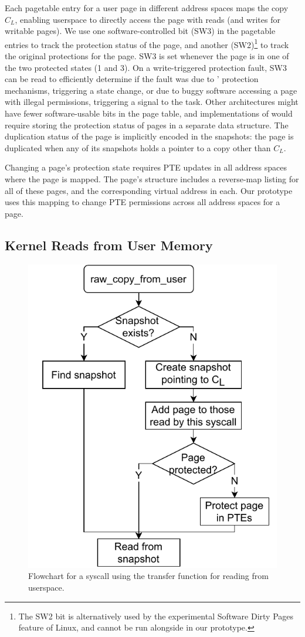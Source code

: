 Each pagetable entry for a user page in different address spaces
maps the copy $C_L$, enabling userspace to directly access the page
with reads (and writes for writable pages).
We use one software-controlled bit (SW3) in the pagetable entries
to track the protection status of the page, and another
(SW2)\footnote{The SW2 bit is alternatively used by the experimental Software Dirty Pages feature of
Linux, and cannot be run alongside \midas in our prototype.}
to track the original protections for the page.
SW3 is set whenever the page is in one of the two protected
states (1 and 3).
On a write-triggered protection fault, SW3 can be read to
efficiently determine if the fault was due to \midas' protection
mechanisms, triggering a state change, or due to buggy software
accessing a page with illegal permissions, triggering a signal to
the task.
Other architectures might have fewer software-usable
bits in the page table, and implementations of \midas would
require storing the protection status of pages in a separate data structure.
The duplication status of the page is implicitly encoded in the
snapshots: the page is duplicated when any of its snapshots
holds a pointer to a copy other than $C_L$.

Changing a page's protection state requires PTE updates
in all address spaces where the page is mapped.
The page's  structure includes a reverse-map
listing for all of these pages, and the corresponding virtual
address in each.
Our prototype uses this mapping to change PTE permissions across
all address spaces for a page.


\subsection{Kernel Reads from User Memory}

\begin{figure}[]
  \centering
  \includegraphics[width=0.6\linewidth]{media/midas/copy_from_user.pdf}
  \caption[\midas: Flowchart for the transfer function ]
          {Flowchart for a syscall using the transfer function
          for reading from userspace.}
  \label{fig:midas:copy_from_user}
\end{figure}

